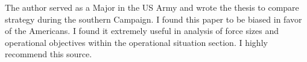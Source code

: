 The author served as a Major in the US Army and wrote the thesis to compare
strategy during the southern Campaign. I found this paper to be biased in favor
of the Americans. I found it extremely useful in analysis of force sizes and
operational objectives within the operational situation section. I highly
recommend this source.
